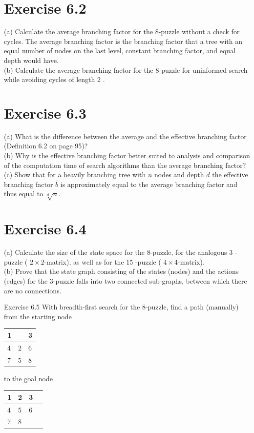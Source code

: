 \documentclass[10pt]{article}
\begin{document}
\section*{Exercise 6.2}
(a) Calculate the average branching factor for the 8-puzzle without a check for cycles. The average branching factor is the branching factor that a tree with an equal number of nodes on the last level, constant branching factor, and equal depth would have.\\
(b) Calculate the average branching factor for the 8-puzzle for uninformed search while avoiding cycles of length 2 .

\section*{Exercise 6.3}
(a) What is the difference between the average and the effective branching factor (Definition 6.2 on page 95)?\\
(b) Why is the effective branching factor better suited to analysis and comparison of the computation time of search algorithms than the average branching factor?\\
(c) Show that for a heavily branching tree with $n$ nodes and depth $d$ the effective branching factor $\bar{b}$ is approximately equal to the average branching factor and thus equal to $\sqrt[d]{n}$.

\section*{Exercise 6.4}
(a) Calculate the size of the state space for the 8-puzzle, for the analogous 3 -puzzle ( $2 \times 2$-matrix), as well as for the 15 -puzzle ( $4 \times 4$-matrix).\\
(b) Prove that the state graph consisting of the states (nodes) and the actions (edges) for the 3-puzzle falls into two connected sub-graphs, between which there are no connections.

Exercise 6.5 With breadth-first search for the 8-puzzle, find a path (manually) from the starting node

\begin{center}
\begin{tabular}{|l|l|l|}
\hline
1 &  & 3 \\
\hline
4 & 2 & 6 \\
\hline
7 & 5 & 8 \\
\hline
\end{tabular}
\end{center} to the goal node \begin{tabular}{|l|l|l|l|}
\hline
1 & 2 & 3 \\
\hline
4 & 5 & 6 \\
\hline
7 & 8 &  \\
\hline
\end{tabular}
\end{document}
